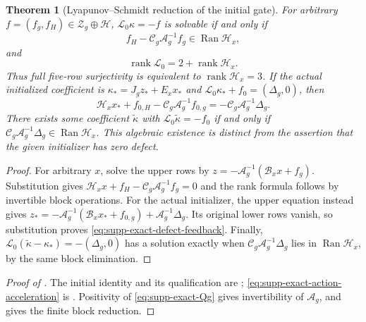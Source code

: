 \documentclass[11pt]{article}
\newtheorem{theorem}{Theorem}[section]
\numberwithin{equation}{section}
\theoremstyle{definition}
\theoremstyle{remark}
\newcommand{\rank}{\operatorname{rank}}
\newcommand{\Ran}{\operatorname{Ran}}
\begin{document}
\begin{theorem}[Lyapunov--Schmidt reduction of the initial gate]
\label{thm:supp-exact-three-row}
For arbitrary $f=(f_g,f_H)\in\mathcal Z_g\oplus\mathcal H$,
$\mathcal L_0\kappa=-f$ is solvable if and only if
\begin{equation}
 f_H-\mathcal C_g\mathcal A_g^{-1}f_g\in\Ran\mathcal H_x,
 \label{eq:supp-exact-hard-forcing}
\end{equation}
and
\begin{equation}
 \rank\mathcal L_0=2+\rank\mathcal H_x.
 \label{eq:supp-exact-slow-rank-split}
\end{equation}
Thus full five-row surjectivity is equivalent to
$\rank\mathcal H_x=3$.  If the actual initialized coefficient is
$\kappa_*=J_gz_*+E_xx_*$ and
$\mathcal L_0\kappa_*+f_0=(\Delta_g,0)$, then
\begin{equation}
 \mathcal H_xx_*+f_{0,H}-\mathcal C_g\mathcal A_g^{-1}f_{0,g}
            =-\mathcal C_g\mathcal A_g^{-1}\Delta_g.
 \label{eq:supp-exact-defect-feedback}
\end{equation}
There exists some coefficient $\widetilde\kappa$ with
$\mathcal L_0\widetilde\kappa=-f_0$ if and only if
$\mathcal C_g\mathcal A_g^{-1}\Delta_g\in\Ran\mathcal H_x$.
This algebraic existence is distinct from the assertion that the given
initializer has zero defect.
\end{theorem}
\begin{proof}
For arbitrary $x$, solve the upper rows by
$z=-\mathcal A_g^{-1}(\mathcal B_xx+f_g)$.  Substitution gives
$\mathcal H_xx+f_H-\mathcal C_g\mathcal A_g^{-1}f_g=0$ and the rank
formula follows by invertible block operations.  For the actual initializer,
the upper equation instead gives
$z_*=-\mathcal A_g^{-1}(\mathcal B_xx_*+f_{0,g})
      +\mathcal A_g^{-1}\Delta_g$.
Its original lower rows vanish, so substitution proves
\eqref{eq:supp-exact-defect-feedback}.  Finally,
$\mathcal L_0(\widetilde\kappa-\kappa_*)=-(\Delta_g,0)$ has a solution
exactly when $\mathcal C_g\mathcal A_g^{-1}\Delta_g$ lies in
$\Ran\mathcal H_x$, by the same block elimination.
\end{proof}

\begin{proof}[Proof of
]
The initial identity and its qualification are
;
\eqref{eq:supp-exact-action-acceleration} is
.  Positivity of
\eqref{eq:supp-exact-Qg} gives invertibility of $\mathcal A_g$, and
 gives the finite block reduction.
\end{proof}
\end{document}
